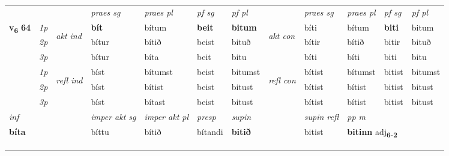 \begin{longtable}[l]{X>{\footnotesize\itshape}llXXXXlXXXX}
 & &   & \textit{praes sg}  & \textit{praes pl}    & \textit{ pf sg} & \textit{pf pl} & & \textit{praes sg}  & \textit{praes pl}    & \textit{pf sg} & \textit{pf pl }  \\ \cmidrule{4-7} \cmidrule{9-12}
 \multirow{2}{*}{{{\textbf{v{\textsubscript{6}}} \Large{\textbf{64}}}}}  & 1p & \multirow{3}{*}{\begin{turn}{90}\textit{akt ind}\end{turn}} & \textbf{bít} & bítum & \textbf{beit} & \textbf{bitum} & \multirow{3}{*}{\begin{turn}{90}\textit{akt con}\end{turn}} &bíti & bítum & \textbf{biti} & bitum\\*
 & 2p &  &  bítur  & bítið & beist & bituð & & bítir & bítið & bitir & bituð \\*
 & 3p &  & bítur & bíta & beit & bitu & & bíti & bíti& biti & bitu \\*
\cmidrule{4-7} \cmidrule{9-12}
 & 1p & \multirow{3}{*}{\begin{turn}{90}\textit{refl ind}\end{turn}}  & bíst & bítumst & beist & bitumst & \multirow{3}{*}{\begin{turn}{90}\textit{refl con}\end{turn}}  &bítist & bítumst & bitist & bitumst \\*
 & 2p &  & bíst & bítist & beist & bitust & &bítist & bítist & bitist & bitust \\*
 & 3p  & & bíst & bítast & beist & bitust & & bítist & bítist& bitist & bitust \\*
\cmidrule{4-7} \cmidrule{9-12}

   {\textit{inf}} & &  & \textit{imper akt sg} & \textit{imper akt pl}   & \textit{presp} & \textit{supin} && \textit{supin refl} & \textit{pp m} \\*
  {\textbf{bíta}} & && bíttu  & bítið   & bítandi &  \textbf{bitið} && bitist & \multicolumn{2}{l}{\textbf{bitinn} adj\textbf{\textsubscript{6-2}}} \\*

\midrule
 & \\*
   & \\*
  & \\
   \midrule


\end{longtable}
